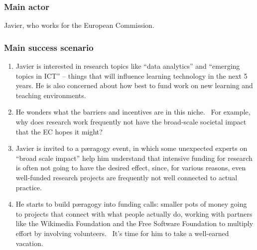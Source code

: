 \subsubsection{Main actor}

Javier, who works for the European Commission.

\subsubsection{Main success scenario}

\begin{enumerate}
\item
  Javier is interested in research topics like ``data analytics'' and
  ``emerging topics in ICT'' -- things that will influence learning
  technology in the next 5 years. He is also concerned about how best to
  fund work on new learning and teaching environments.
\item
  He wonders what the barriers and incentives are in this niche. ~For
  example, why does research work frequently not have the broad-scale
  societal impact that the EC hopes it might?
\item
  Javier is invited to a pæragogy event, in which some unexpected
  experts on ``broad scale impact'' help him understand that intensive
  funding for research is often not going to have the desired effect,
  since, for various reasons, even well-funded research projects are
  frequently not well connected to actual practice.
\item
  He starts to build pæragogy into funding calls: smaller pots of money
  going to projects that connect with what people actually do, working
  with partners like the Wikimedia Foundation and the Free Software
  Foundation to multiply effort by involving volunteers. ~It's time for
  him to take a well-earned vacation.
\end{enumerate}
